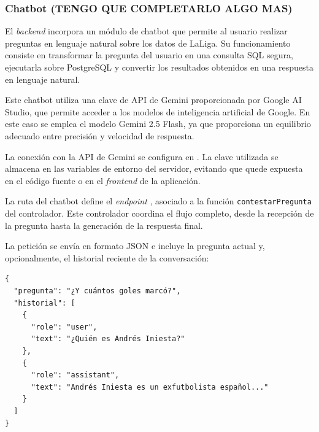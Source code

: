 


\subsubsection{Chatbot \textbf{(TENGO QUE COMPLETARLO ALGO MAS)}}

El \textit{backend} incorpora un módulo de chatbot que permite al usuario realizar preguntas en lenguaje natural sobre los datos de LaLiga. Su funcionamiento consiste en transformar la pregunta del usuario en una consulta SQL segura, ejecutarla sobre PostgreSQL y convertir los resultados obtenidos en una respuesta en lenguaje natural.

Este chatbot utiliza una clave de API de Gemini proporcionada por Google AI Studio, que permite acceder a los modelos de inteligencia artificial de Google. En este caso se emplea el modelo Gemini 2.5 Flash, ya que proporciona un equilibrio adecuado entre precisión y velocidad de respuesta.

La conexión con la API de Gemini se configura en . La clave utilizada se almacena en las variables de entorno del servidor, evitando que quede expuesta en el código fuente o en el \textit{frontend} de la aplicación.

La ruta del chatbot define el \textit{endpoint} , asociado a la función \texttt{contestarPregunta} del controlador. Este controlador coordina el flujo completo, desde la recepción de la pregunta hasta la generación de la respuesta final.

La petición se envía en formato JSON e incluye la pregunta actual y, opcionalmente, el historial reciente de la conversación:

\begin{verbatim}
{
  "pregunta": "¿Y cuántos goles marcó?",
  "historial": [
    {
      "role": "user",
      "text": "¿Quién es Andrés Iniesta?"
    },
    {
      "role": "assistant",
      "text": "Andrés Iniesta es un exfutbolista español..."
    }
  ]
}
\end{verbatim}

